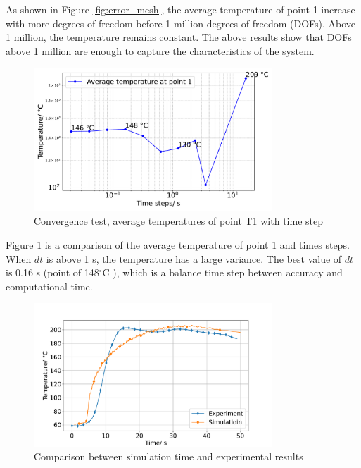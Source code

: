  As shown in Figure \ref{fig:error_mesh}, the average temperature of point 1 increase with more degrees of freedom before 1 million degrees of freedom (DOFs). Above 1 million, the temperature remains constant.  The above results show that DOFs above 1 million are enough to capture the characteristics of the system. 
\begin{figure}[h]
    \centering
  
    \includegraphics[width=0.8\textwidth]{book/chapters/zhang/graphics/T_ave_vs_dt.pdf}
    \caption{Convergence test, average temperatures of point T1 with time step}
    \label{fig:error_time}
\end{figure}


Figure \ref{fig:error_time} is a comparison of the average temperature of point 1 and times steps. When \(dt\) is above 1 s, the temperature has a large variance. The best value of \(dt\) is 0.16 s (point of 148$^{\circ}\text{C}$ ), which is a balance time step between accuracy and computational time.

\begin{figure}[h]
    \centering
    \includegraphics[width=0.8\textwidth]{book/chapters/zhang/graphics/T_sim_exe.pdf}
    \caption{Comparison between simulation time and experimental results}
    \label{fig:experiment}
\end{figure}

